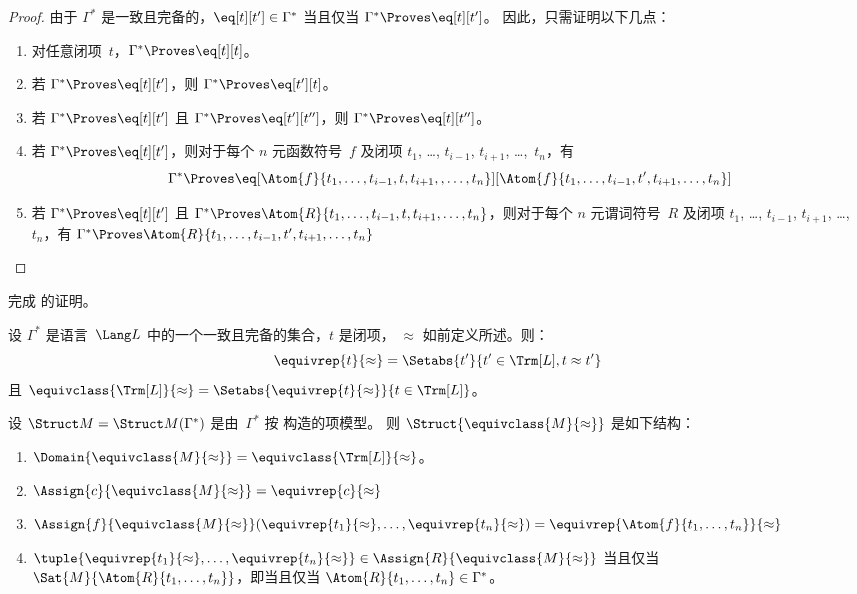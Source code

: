 \documentclass[../../../include/open-logic-section]{subfiles}
\begin{document}
\begin{proof}
由于 $\Gamma^*$ 是一致且完备的，$\eq[t][t'] \in
\Gamma^*$ 当且仅当 $\Gamma^* \Proves \eq[t][t']$。
因此，只需证明以下几点：
\begin{enumerate}
\item 对任意闭项~$t$，$\Gamma^* \Proves \eq[t][t]$。
\item 若 $\Gamma^* \Proves \eq[t][t']$，则 $\Gamma^* \Proves \eq[t'][t]$。
\item 若 $\Gamma^* \Proves \eq[t][t']$ 且 $\Gamma^* \Proves
  \eq[t'][t'']$，则 $\Gamma^* \Proves \eq[t][t'']$。
\item 若 $\Gamma^* \Proves \eq[t][t']$，则对于每个 $n$ 元函数符号~$f$ 及闭项 $t_1$, \dots,
$t_{i-1}$, $t_{i+1}$, \dots,~$t_n$，有
\[
\Gamma^* \Proves
\eq[\Atom{f}{t_1,\dots,t_{i-1},t,t_{i+1},,\dots,t_n}][\Atom{f}{t_1,\dots,t_{i-1},t',t_{i+1},\dots,t_n}]
\]
\item 若 $\Gamma^* \Proves \eq[t][t']$ 且
$\Gamma^* \Proves
\Atom{R}{t_1,\dots,t_{i-1},t,t_{i+1},\dots,t_n}$，则对于每个 $n$ 元谓词符号~$R$ 及闭项 $t_1$, \dots,
$t_{i-1}$, $t_{i+1}$, \dots,~$t_n$，有
$\Gamma^* \Proves \Atom{R}{t_1,\dots,t_{i-1},t',t_{i+1},\dots,t_n}$
\end{enumerate}
\end{proof}

\begin{prob}
完成  的证明。
\end{prob}

\begin{defn}
设 $\Gamma^*$ 是语言~$\Lang L$ 中的一个一致且完备的集合，$t$ 是闭项，
$\approx$ 如前定义所述。则：
\[
\equivrep{t}{\approx} = \Setabs{t'}{t'\in \Trm[L], t \approx t'}
\]
且 $\equivclass{\Trm[L]}{\approx} = \Setabs{\equivrep{t}{\approx}}{t \in \Trm[L]}$。
\end{defn}

\begin{defn}
设 $\Struct M = \Struct M(\Gamma^*)$ 是由~$\Gamma^*$ 按  构造的项模型。
则 $\Struct{\equivclass{M}{\approx}}$ 是如下结构：
\begin{enumerate}
\item $\Domain{\equivclass{M}{\approx}} = \equivclass{\Trm[L]}{\approx}$。
\item $\Assign{c}{\equivclass{M}{\approx}} = \equivrep{c}{\approx}$
\item $\Assign{f}{\equivclass{M}{\approx}}(\equivrep{t_1}{\approx}, \dots,
  \equivrep{t_n}{\approx}) = \equivrep{\Atom{f}{t_1,\dots, t_n}}{\approx}$
\item $\tuple{\equivrep{t_1}{\approx}, \dots, \equivrep{t_n}{\approx}} \in
  \Assign{R}{\equivclass{M}{\approx}}$ 当且仅当
  $\Sat{M}{\Atom{R}{t_1,\dots, t_n}}$，即当且仅当 $\Atom{R}{t_1,\dots,
  t_n} \in \Gamma^*$。
\end{enumerate}
\end{defn}
\end{document}
